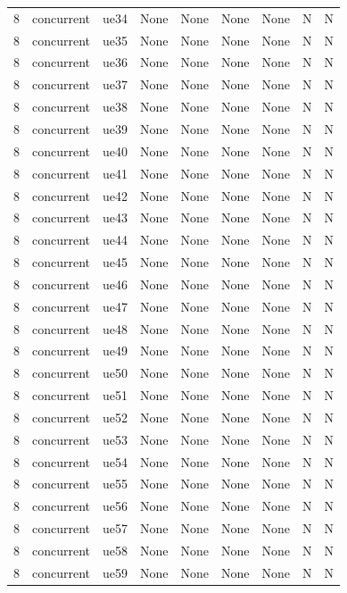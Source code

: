 \begin{table}[ht]
\begin{tabular}{|c|c|c|c|c|c|c|c|c|}
8 & concurrent & ue34 & None & None & None & None & N & N \\
8 & concurrent & ue35 & None & None & None & None & N & N \\
8 & concurrent & ue36 & None & None & None & None & N & N \\
8 & concurrent & ue37 & None & None & None & None & N & N \\
8 & concurrent & ue38 & None & None & None & None & N & N \\
8 & concurrent & ue39 & None & None & None & None & N & N \\
8 & concurrent & ue40 & None & None & None & None & N & N \\
8 & concurrent & ue41 & None & None & None & None & N & N \\
8 & concurrent & ue42 & None & None & None & None & N & N \\
8 & concurrent & ue43 & None & None & None & None & N & N \\
8 & concurrent & ue44 & None & None & None & None & N & N \\
8 & concurrent & ue45 & None & None & None & None & N & N \\
8 & concurrent & ue46 & None & None & None & None & N & N \\
8 & concurrent & ue47 & None & None & None & None & N & N \\
8 & concurrent & ue48 & None & None & None & None & N & N \\
8 & concurrent & ue49 & None & None & None & None & N & N \\
8 & concurrent & ue50 & None & None & None & None & N & N \\
8 & concurrent & ue51 & None & None & None & None & N & N \\
8 & concurrent & ue52 & None & None & None & None & N & N \\
8 & concurrent & ue53 & None & None & None & None & N & N \\
8 & concurrent & ue54 & None & None & None & None & N & N \\
8 & concurrent & ue55 & None & None & None & None & N & N \\
8 & concurrent & ue56 & None & None & None & None & N & N \\
8 & concurrent & ue57 & None & None & None & None & N & N \\
8 & concurrent & ue58 & None & None & None & None & N & N \\
8 & concurrent & ue59 & None & None & None & None & N & N \\

\end{tabular}
\end{table}
